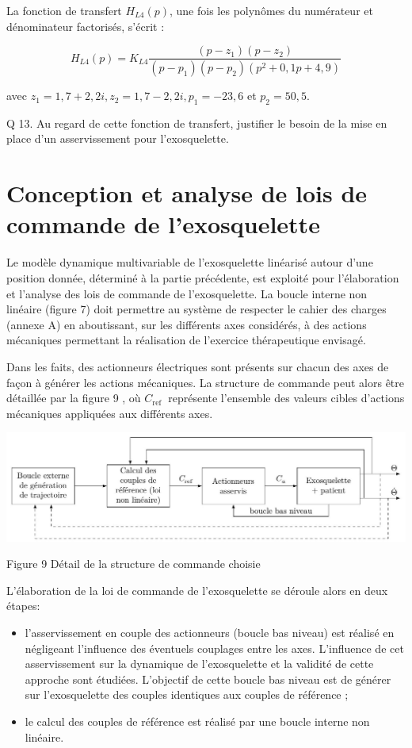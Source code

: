 \documentclass[10pt]{article}
\begin{document}
La fonction de transfert $H_{L 4}(p)$, une fois les polynômes du numérateur et dénominateur factorisés, s'écrit :

$$
H_{L 4}(p)=K_{L 4} \frac{\left(p-z_{1}\right)\left(p-z_{2}\right)}{\left(p-p_{1}\right)\left(p-p_{2}\right)\left(p^{2}+0,1 p+4,9\right)}
$$

avec $z_{1}=1,7+2,2 i, z_{2}=1,7-2,2 i, p_{1}=-23,6$ et $p_{2}=50,5$.

Q 13. Au regard de cette fonction de transfert, justifier le besoin de la mise en place d'un asservissement pour l'exosquelette.

\section{Conception et analyse de lois de commande de l'exosquelette}
Le modèle dynamique multivariable de l'exosquelette linéarisé autour d'une position donnée, déterminé à la partie précédente, est exploité pour l'élaboration et l'analyse des lois de commande de l'exosquelette. La boucle interne non linéaire (figure 7) doit permettre au système de respecter le cahier des charges (annexe A) en aboutissant, sur les différents axes considérés, à des actions mécaniques permettant la réalisation de l'exercice thérapeutique envisagé.

Dans les faits, des actionneurs électriques sont présents sur chacun des axes de façon à générer les actions mécaniques. La structure de commande peut alors être détaillée par la figure 9 , où $C_{\text {ref }}$ représente l'ensemble des valeurs cibles d'actions mécaniques appliquées aux différents axes.

\begin{center}
\includegraphics[max width=\textwidth]{2023_05_12_54c6a64d2ffce28d5c72g-07}
\end{center}

Figure 9 Détail de la structure de commande choisie

L'élaboration de la loi de commande de l'exosquelette se déroule alors en deux étapes:

\begin{itemize}
  \item l'asservissement en couple des actionneurs (boucle bas niveau) est réalisé en négligeant l'influence des éventuels couplages entre les axes. L'influence de cet asservissement sur la dynamique de l'exosquelette et la validité de cette approche sont étudiées. L'objectif de cette boucle bas niveau est de générer sur l'exosquelette des couples identiques aux couples de référence ;

  \item le calcul des couples de référence est réalisé par une boucle interne non linéaire.

\end{itemize}
\end{document}
